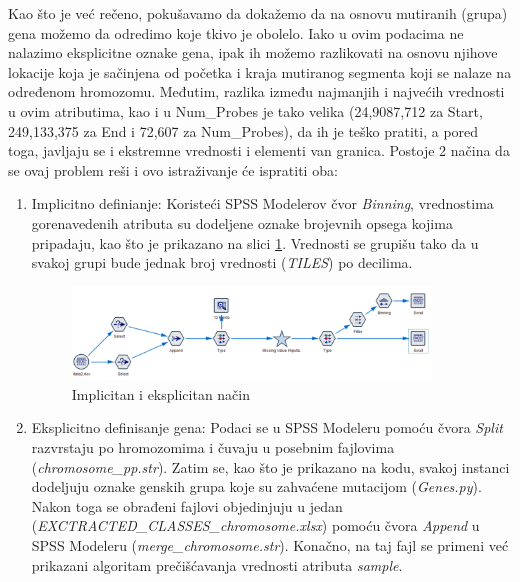 \documentclass[a4paper]{article}
\begin{document}
Kao što je već rečeno, pokušavamo da dokažemo da na osnovu mutiranih (grupa) gena možemo da odredimo koje tkivo je obolelo. Iako u ovim podacima ne nalazimo eksplicitne oznake gena, ipak ih možemo razlikovati na osnovu njihove lokacije koja je sačinjena od početka i kraja mutiranog segmenta koji se nalaze na određenom hromozomu. Međutim, razlika između najmanjih i najvećih vrednosti u ovim atributima, kao i u Num\_Probes je tako velika (24,9087,712 za Start, 249,133,375 za End i 72,607 za Num\_Probes), da ih je teško pratiti, a pored toga, javljaju se i ekstremne vrednosti i elementi van granica. Postoje 2 načina da se ovaj problem reši i ovo istraživanje će ispratiti oba:
\begin{enumerate}
    \item Implicitno definianje: Koristeći SPSS Modelerov čvor \textit{Binning}, vrednostima gorenavedenih atributa su dodeljene oznake brojevnih opsega kojima pripadaju, kao što je prikazano na slici \ref{fig:classes}. Vrednosti se grupišu tako da u svakoj grupi bude jednak broj vrednosti (\textit{TILES}) po decilima.
    
    \begin{figure}[ht!]
                \centering
                \includegraphics[width=0.9\textwidth]{classes.PNG}
                \caption{Implicitan i eksplicitan način}
                \label{fig:classes}
            \end{figure}
    
    \item Eksplicitno definisanje gena: Podaci se u SPSS Modeleru pomoću čvora \textit{Split} razvrstaju po hromozomima i čuvaju u posebnim fajlovima (\textit{chromosome\_pp.str}). Zatim se, kao što je prikazano na kodu, svakoj instanci dodeljuju oznake genskih grupa koje su zahvaćene mutacijom (\textit{Genes.py}). Nakon toga se  obrađeni fajlovi objedinjuju u jedan (\textit{EXCTRACTED\_CLASSES\_chromosome.xlsx}) pomoću čvora \textit{Append} u SPSS Modeleru (\textit{merge\_chromosome.str}). Konačno, na taj fajl se primeni već prikazani algoritam prečišćavanja vrednosti atributa \textit{sample}.
    
    
\end{enumerate}
\end{document}
